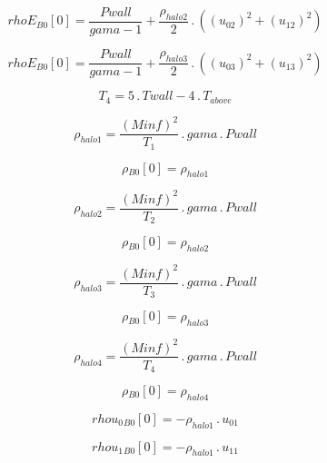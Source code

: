 \documentclass{article}
\begin{document}
\begin{dmath}{rhoE{_{B0}}}[{0}] = \frac{Pwall}{gama - 1} + \frac{\rho_{halo 2}}{2} \,.\, \left(\left(u_{02} \right)^{2} + \left(u_{12} \right)^{2}\right)\end{dmath}

\begin{dmath}{rhoE{_{B0}}}[{0}] = \frac{Pwall}{gama - 1} + \frac{\rho_{halo 3}}{2} \,.\, \left(\left(u_{03} \right)^{2} + \left(u_{13} \right)^{2}\right)\end{dmath}

\begin{dmath}T_{4} = 5 \,.\, Twall - 4 \,.\, T_{above}\end{dmath}

\begin{dmath}\rho_{halo 1} = \frac{\left(Minf \right)^{2}}{T_{1}} \,.\, gama \,.\, Pwall\end{dmath}

\begin{dmath}{\rho{_{B0}}}[{0}] = \rho_{halo 1}\end{dmath}

\begin{dmath}\rho_{halo 2} = \frac{\left(Minf \right)^{2}}{T_{2}} \,.\, gama \,.\, Pwall\end{dmath}

\begin{dmath}{\rho{_{B0}}}[{0}] = \rho_{halo 2}\end{dmath}

\begin{dmath}\rho_{halo 3} = \frac{\left(Minf \right)^{2}}{T_{3}} \,.\, gama \,.\, Pwall\end{dmath}

\begin{dmath}{\rho{_{B0}}}[{0}] = \rho_{halo 3}\end{dmath}

\begin{dmath}\rho_{halo 4} = \frac{\left(Minf \right)^{2}}{T_{4}} \,.\, gama \,.\, Pwall\end{dmath}

\begin{dmath}{\rho{_{B0}}}[{0}] = \rho_{halo 4}\end{dmath}

\begin{dmath}{rhou_{0}{_{B0}}}[{0}] = - \rho_{halo 1} \,.\, u_{01}\end{dmath}

\begin{dmath}{rhou_{1}{_{B0}}}[{0}] = - \rho_{halo 1} \,.\, u_{11}\end{dmath}
\end{document}
